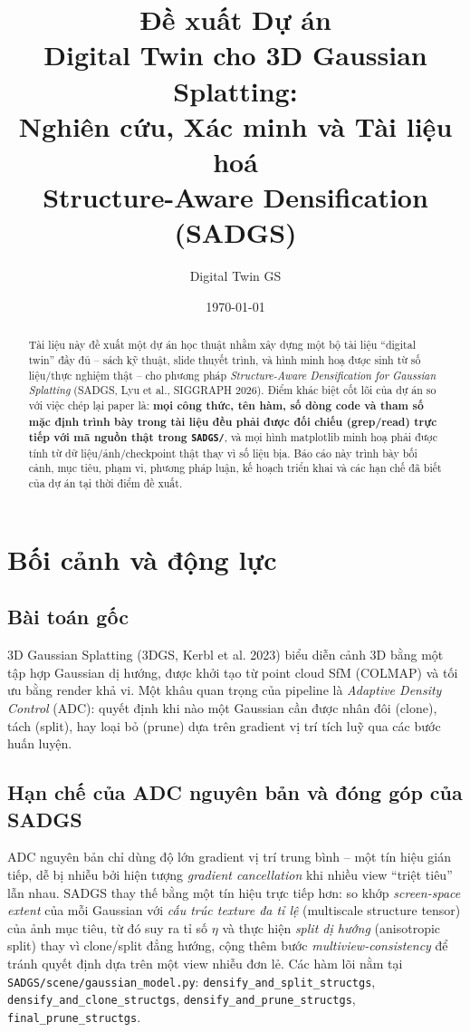 \documentclass[a4paper,11pt]{article}
\title{\textbf{Đề xuất Dự án}\\[4pt]
\Large Digital Twin cho 3D Gaussian Splatting:\\
Nghiên cứu, Xác minh và Tài liệu hoá\\
Structure-Aware Densification (SADGS)}
\author{Digital Twin GS}
\date{\today}
\begin{document}
\maketitle
\thispagestyle{empty}

\begin{abstract}
\noindent
Tài liệu này đề xuất một dự án học thuật nhằm xây dựng một bộ tài liệu ``digital twin'' đầy
đủ -- sách kỹ thuật, slide thuyết trình, và hình minh hoạ được sinh từ số liệu/thực nghiệm
thật -- cho phương pháp \emph{Structure-Aware Densification for Gaussian Splatting} (SADGS,
Lyu et al., SIGGRAPH 2026). Điểm khác biệt cốt lõi của dự án so với việc chép lại paper là:
\textbf{mọi công thức, tên hàm, số dòng code và tham số mặc định trình bày trong tài liệu đều
phải được đối chiếu (grep/read) trực tiếp với mã nguồn thật trong \texttt{SADGS/}}, và mọi
hình matplotlib minh hoạ phải được tính từ dữ liệu/ảnh/checkpoint thật thay vì số liệu bịa.
Báo cáo này trình bày bối cảnh, mục tiêu, phạm vi, phương pháp luận, kế hoạch triển khai và
các hạn chế đã biết của dự án tại thời điểm đề xuất.
\end{abstract}

\vspace{0.5cm}
\tableofcontents

\newpage

\section{Bối cảnh và động lực}

\subsection{Bài toán gốc}
3D Gaussian Splatting (3DGS, Kerbl et al. 2023) biểu diễn cảnh 3D bằng một tập hợp Gaussian
dị hướng, được khởi tạo từ point cloud SfM (COLMAP) và tối ưu bằng render khả vi. Một khâu
quan trọng của pipeline là \emph{Adaptive Density Control} (ADC): quyết định khi nào một
Gaussian cần được nhân đôi (clone), tách (split), hay loại bỏ (prune) dựa trên gradient vị trí
tích luỹ qua các bước huấn luyện.

\subsection{Hạn chế của ADC nguyên bản và đóng góp của SADGS}
ADC nguyên bản chỉ dùng độ lớn gradient vị trí trung bình -- một tín hiệu gián tiếp, dễ bị
nhiễu bởi hiện tượng \emph{gradient cancellation} khi nhiều view ``triệt tiêu'' lẫn nhau.
SADGS thay thế bằng một tín hiệu trực tiếp hơn: so khớp \emph{screen-space extent} của mỗi
Gaussian với \emph{cấu trúc texture đa tỉ lệ} (multiscale structure tensor) của ảnh mục tiêu,
từ đó suy ra tỉ số $\eta$ và thực hiện \emph{split dị hướng} (anisotropic split) thay vì
clone/split đẳng hướng, cộng thêm bước \emph{multiview-consistency} để tránh quyết định dựa
trên một view nhiễu đơn lẻ. Các hàm lõi nằm tại \texttt{SADGS/scene/gaussian\_model.py}:
\texttt{densify\_and\_split\_structgs}, \texttt{densify\_and\_clone\_structgs},
\texttt{densify\_and\_prune\_structgs}, \texttt{final\_prune\_structgs}.
\end{document}
